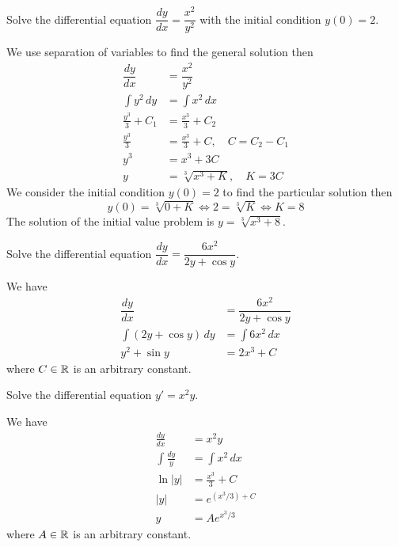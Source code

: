 \begin{problem}
    Solve the differential equation \(\dfrac{dy}{dx}=\dfrac{x^2}{y^2}\) with
    the initial condition \(y(0)=2\).
\end{problem}
\begin{solution}
    We use separation of variables to find the general solution then
    \begin{align*}
        \dfrac{dy}{dx} &= \dfrac{x^2}{y^2} \\
        \int y^2\,dy &= \int x^2\,dx \\
        \frac{y^3}{3}+C_1 &= \frac{x^3}{3}+C_2 \\
        \frac{y^3}{3} &=\frac{x^3}{3}+C,\quad C=C_2-C_1 \\
        y^3 &= x^3+3C \\
        y &= \sqrt[3]{x^3+K},\quad K=3C
    \end{align*}
    We consider the initial condition \(y(0)=2\) to find the particular
    solution then
    \[y(0)=\sqrt[3]{0+K}\iff 2=\sqrt[3]{K}\iff K=8\]
    The solution of the initial value problem is \(y=\sqrt[3]{x^3+8}\).
\end{solution}
\begin{problem}
    Solve the differential equation \(\dfrac{dy}{dx}=\dfrac{6x^2}{2y+\cos y}\).
\end{problem}
\begin{solution}
    We have
    \begin{align*}
        \dfrac{dy}{dx} &= \dfrac{6x^2}{2y+\cos y} \\
        \int(2y+\cos y)\,dy &= \int 6x^2\,dx \\
        y^2+\sin y &= 2x^3+C
    \end{align*}
    where \(C\in\mathbb{R}\) is an arbitrary constant.
\end{solution}
\begin{problem}
    Solve the differential equation \(y'=x^2y\).
\end{problem}
\begin{solution}
    We have
    \begin{align*}
        \frac{dy}{dx} &= x^2y \\ \int \frac{dy}{y} &= \int x^2\,dx \\
        \ln |y| &= \frac{x^3}{3}+C \\ |y| &= e^{(x^3/3)+C}\\ y &= Ae^{x^3/3}
    \end{align*}
    where \(A\in\mathbb{R}\) is an arbitrary constant.
\end{solution}

